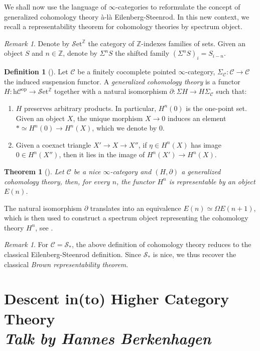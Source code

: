 \documentclass[a4paper]{book}
\newcommand{\lC}{\mathcal{C}}
\newcommand{\lS}{\mathcal{S}}
\newcommand{\bZ}{\mathbb{Z}}
\newcommand{\op}{\mathrm{op}}
\newcommand{\set}{\lS\mathrm{et}} %
\newcommand{\Ho}{\mathrm{h}} %
\newtheorem{theorem}[equation]{Theorem}
\theoremstyle{definition}
\newtheorem{definition}[equation]{Definition}
\theoremstyle{remark}
\newtheorem{remark}[equation]{Remark}
\numberwithin{equation}{section}
\begin{document}
We shall now use the language of $\infty$-categories to reformulate the concept of generalized cohomology theory \` a-l\`a Eilenberg-Steenrod. In this new context, we recall a representability theorem for cohomology theories by spectrum object. 
\begin{remark}
  Denote by $\set^\bZ$ the category of $\bZ$-indexes families of sets. Given an object $S$ and $n\in\bZ$, denote by $\Sigma^n S$ the shifted family $(\Sigma^nS)_i=S_{i-n}$.  
\end{remark}
\begin{definition}[{\cite[1.4.1.6]{lurie2017ha}}]\label{def:cohthe}
  Let $\lC$ be a finitely cocomplete pointed $\infty$-category, $\Sigma_\lC:\lC \to \lC$ the induced suspension functor. A \emph{generalized cohomology theory} is a functor $H:\Ho\lC^{\op}\to\set^\bZ$ together with a natural isomorphism $\partial:\Sigma H\to H\Sigma_\lC$ such that:
  \begin{enumerate}
    \item $H$ preserves arbitrary products. In particular, $H^n(0)$ is the one-point set. Given an object $X$, the unique morphism $X\to0$ induces an element $*\simeq H^n(0)\to H^n(X)$, which we denote by $0$. 
    \item Given a coexact triangle $X'\to X\to X''$, if $\eta\in H^n(X)$ has image $0\in H^n(X'')$, then it lies in the image of $H^n(X')\to H^n(X)$. 
  \end{enumerate}
\end{definition}
\begin{theorem}[{\cite[1.4.1.10]{lurie2017ha}}]
 Let $\lC$ be a nice $\infty$-category and $(H,\partial)$ a generalized cohomology theory, then, for every $n$, the functor $H^n$ is representable by an object $E(n)$. 
\end{theorem}
The natural isomorphism $\partial$ translates into an equivalence $E(n)\simeq\Omega E(n+1)$, which is then used to construct a spectrum object representing the cohomology theory $H^n$, see \cite[1.4.1.11]{lurie2017ha}.
\begin{remark}
  For $\lC=\lS_*$, the above definition of cohomology theory reduces to the classical Eilenberg-Steenrod definition. Since $\lS_*$ is nice, we thus recover the classical \emph{Brown representability theorem}. 
\end{remark}

\chapter{Descent in(to) Higher Category Theory \texorpdfstring{\\}{ } \normalsize \emph{Talk by Hannes Berkenhagen}}
\end{document}
